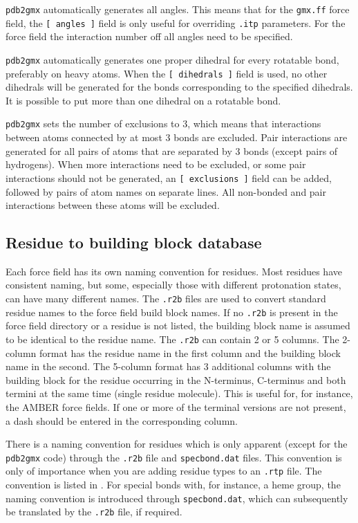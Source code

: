 {\tt pdb2gmx} automatically generates all angles. This means that for the
{\tt gmx.ff} force field,
the {\tt [~angles~]} field is only useful for overriding {\tt .itp}
parameters. For the  force field the interaction number
off all angles need to be specified.

{\tt pdb2gmx} automatically generates one proper dihedral for every rotatable
bond, preferably on heavy atoms. When the {\tt [~dihedrals~]} field is used,
no other dihedrals will be generated for the bonds corresponding to the
specified  dihedrals. It is possible to put more than one dihedral on a
rotatable bond. 

{\tt pdb2gmx} sets the number of exclusions to 3, which
means that interactions between atoms connected by at most 3 bonds are
excluded. Pair interactions are generated for all pairs of atoms that are
separated by 3 bonds (except pairs of hydrogens).
When more interactions need to be excluded, or some pair interactions should
not be generated, an {\tt [~exclusions~]} field can be added, followed by
pairs of atom names on separate lines. All non-bonded and pair interactions
between these atoms will be excluded.

\subsection{Residue to building block database}
Each force field has its own naming convention for residues.
Most residues have consistent naming, but some, especially those
with different protonation states, can have many different names.
The {\tt .r2b} files are used to convert standard residue names to
the force field build block names. If no {\tt .r2b} is present
in the force field directory or a residue is not listed, the building
block name is assumed to be identical to the residue name.
The {\tt .r2b} can contain 2 or 5 columns. The 2-column format
has the residue name in the first column and the building block name
in the second. The 5-column format has 3 additional columns with
the building block for the residue occurring in the N-terminus, C-terminus
and both termini at the same time (single residue molecule).
This is useful for, for instance, the AMBER force fields.
If one or more of the terminal versions are not present, a dash should be entered
in the corresponding column.

There is a {\gromacs} naming convention for residues which is only
apparent (except for the {\tt pdb2gmx} code) through the {\tt .r2b} file
and {\tt specbond.dat} files.
This convention is only of importance when you are adding residue types
to an {\tt .rtp} file. The convention is listed in .
For special bonds with, for instance, a heme group, the {\gromacs} naming
convention is introduced through {\tt specbond.dat}, which can
subsequently be translated by the {\tt .r2b} file, if required.

